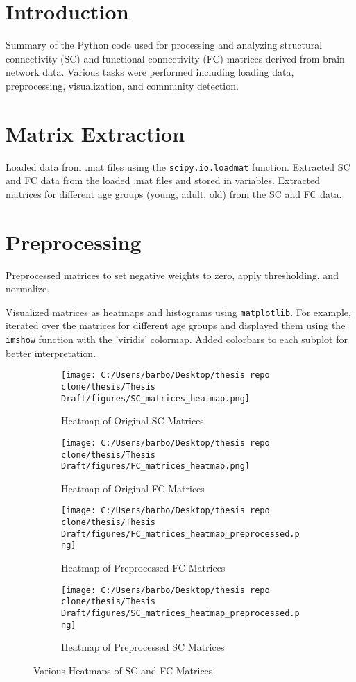 
\section{Introduction}
Summary of the Python code used for processing and analyzing structural connectivity (SC) and functional connectivity (FC) matrices derived from brain network data. Various tasks were performed including loading data, preprocessing, visualization, and community detection.

\section{Matrix Extraction}
Loaded data from .mat files using the \texttt{scipy.io.loadmat} function.
Extracted SC and FC data from the loaded .mat files and stored in variables.
Extracted matrices for different age groups (young, adult, old) from the SC and FC data.

\section{Preprocessing}
Preprocessed matrices to set negative weights to zero, apply thresholding, and normalize.

Visualized matrices as heatmaps and histograms using \texttt{matplotlib}. For example, iterated over the matrices for different age groups and displayed them using the \texttt{imshow} function with the 'viridis' colormap. Added colorbars to each subplot for better interpretation.

\begin{figure}[h!]
    \centering
    \begin{subfigure}[b]{0.45\textwidth}
        \texttt{[image: C:/Users/barbo/Desktop/thesis repo clone/thesis/Thesis Draft/figures/SC\_matrices\_heatmap.png]}
        \caption{Heatmap of Original SC Matrices}
    \end{subfigure}
    \begin{subfigure}[b]{0.45\textwidth}
        \texttt{[image: C:/Users/barbo/Desktop/thesis repo clone/thesis/Thesis Draft/figures/FC\_matrices\_heatmap.png]}
        \caption{Heatmap of Original FC Matrices}
    \end{subfigure}
    
    \begin{subfigure}[b]{0.45\textwidth}
        \texttt{[image: C:/Users/barbo/Desktop/thesis repo clone/thesis/Thesis Draft/figures/FC\_matrices\_heatmap\_preprocessed.png]}
        \caption{Heatmap of Preprocessed FC Matrices}
    \end{subfigure}
    \begin{subfigure}[b]{0.45\textwidth}
        \texttt{[image: C:/Users/barbo/Desktop/thesis repo clone/thesis/Thesis Draft/figures/SC\_matrices\_heatmap\_preprocessed.png]}
        \caption{Heatmap of Preprocessed SC Matrices}
    \end{subfigure}
    
    \caption{Various Heatmaps of SC and FC Matrices}
\end{figure}

